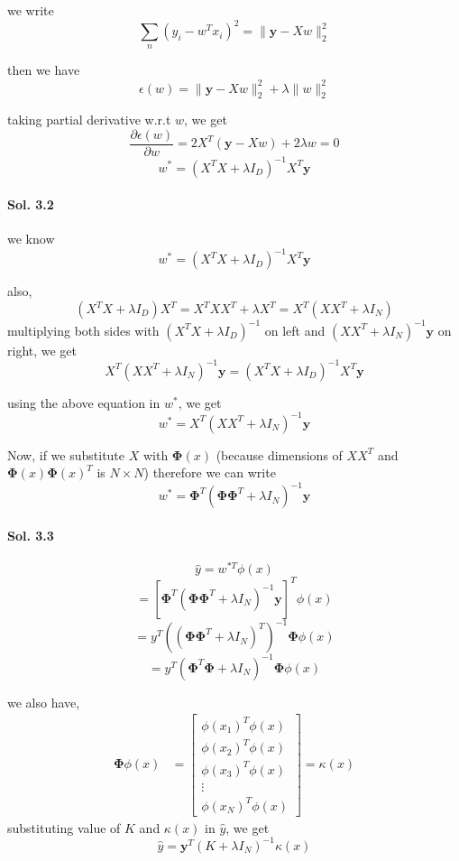 \documentclass[]{report}
\begin{document}
  	we write
  	\[ \sum_n (y_i - w^T x_i)^2 = \| \textbf{y} - Xw \|_2^2 \]
  	
  	then we have 
  	\[ \epsilon(w) = \|\textbf{y} - Xw\|_2^2 + \lambda \| w\|_2^2 \]

	taking partial derivative w.r.t $w$, we get 
	\[ \frac{\partial{\epsilon(w)}}{\partial{w}} = 2 X^T (\textbf{y} - Xw) + 2\lambda w = 0\]
	\begin{equation}
		 w^* = {(X^T X + \lambda I_D)}^{-1} X^T \textbf{y}
	\end{equation}

\paragraph{Sol. 3.2}	
	we know
	\[ w^* =  {(X^T X + \lambda I_D)}^{-1} X^T \textbf{y} \]
	 
	also, 
	\[ (X^T X + \lambda I_D) X^T = X^T X X^T + \lambda X^T = X^T (X X^T + \lambda I_N)\] 
	multiplying both sides with $(X^T X + \lambda I_D)^{-1}$ on left and $(X X^T + \lambda I_N)^{-1} \textbf{y}$ on right, we get
	\[ X^T (X X^T + \lambda I_N)^{-1} \textbf{y} = (X^T X + \lambda I_D)^{-1} X^T \textbf{y} \]

	using the above equation in $w^{*}$, we get
	\[ w^{*} = X^T (X X^T + \lambda I_N)^{-1} \textbf{y}\]

	Now, if we substitute $X$ with $\mathbf{\Phi} (x)$ (because dimensions of $XX^T$ and $\mathbf{\Phi}(x) {\mathbf{\Phi}(x)}^T$ is $N \times N$)
	therefore we can write 
	\[ w^* = \mathbf{\Phi}^T {(\mathbf{\Phi} \mathbf{\Phi}^T + \lambda I_N)}^{-1} \textbf{y} \]
	
\paragraph{Sol. 3.3}
	\[ \hat{y} = w^{*T}\phi(x)\]
	\[ = {[\mathbf{\Phi}^T {(\mathbf{\Phi} \mathbf{\Phi}^T + \lambda I_N)}^{-1} \textbf{y}]}^{T} \phi(x)\]
	\[ = y^T {((\mathbf{\Phi} \mathbf{\Phi}^T + \lambda I_N)^T)}^{-1} \mathbf{\Phi} \phi(x) \]
	\[ = y^T {(\mathbf{\Phi}^T \mathbf{\Phi} + \lambda I_N)}^{-1} \mathbf{\Phi} \phi(x) \]
	
	we also have, 
	\begin{align}
    	\mathbf{\Phi} \phi(x) &= \begin{bmatrix}
           \phi(x_1)^T \phi(x) \\
           \phi(x_2)^T \phi(x) \\
           \phi(x_3)^T \phi(x) \\
           \vdots  \\
           \phi(x_N)^T \phi(x)
         \end{bmatrix} = \kappa(x)
  	\end{align}
	substituting value of $K$ and $\kappa(x)$ in $\hat{y}$, we get 
	\[ \hat{y} = \textbf{y}^T (K + \lambda I_N)^{-1} \kappa(x) \]
\end{document}
